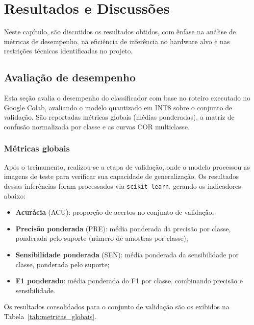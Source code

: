 \documentclass[repeatfields,xlists,xpacks,oneside]{ufrgscca}
\begin{document}
\chapter{Resultados e Discussões}
\label{cap:resultados}

Neste capítulo, são discutidos os resultados obtidos, com ênfase na análise de métricas de desempenho, na eficiência de inferência no hardware alvo e nas restrições técnicas identificadas no projeto.

\section{Avaliação de desempenho}
\label{sec:avaliacao-desempenho}

Esta seção avalia o desempenho do classificador com base no roteiro executado no Google Colab, avaliando o modelo quantizado em INT8 sobre o conjunto de validação. São reportadas métricas globais (médias ponderadas), a matriz de confusão normalizada por classe e as curvas COR multiclasse.

\subsection{Métricas globais}
Após o treinamento, realizou-se a etapa de validação, onde o modelo processou as imagens de teste para verificar sua capacidade de generalização. Os resultados dessas inferências foram processados via \texttt{scikit-learn}, gerando os indicadores abaixo:

\begin{itemize}
    \item \textbf{Acurácia} (ACU): proporção de acertos no conjunto de validação;
    \item \textbf{Precisão ponderada} (PRE): média ponderada da precisão por classe, ponderada pelo suporte (número de amostras por classe);
    \item \textbf{Sensibilidade ponderada} (SEN): média ponderada da sensibilidade por classe, ponderada pelo suporte;
    \item \textbf{F1 ponderado}: média ponderada do F1 por classe, combinando precisão e sensibilidade.
\end{itemize}

Os resultados consolidados para o conjunto de validação são os exibidos na Tabela~\ref{tab:metricas_globais}.
\end{document}
